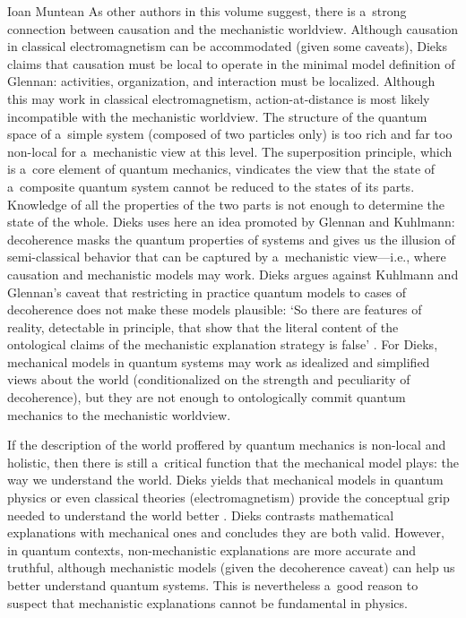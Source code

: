 \begin{recengenv}{Ioan Muntean}
As other authors in this volume suggest, there is a~strong connection between causation and the mechanistic worldview. Although causation in classical electromagnetism can be accommodated (given some caveats), Dieks claims that causation must be local to operate in the minimal model definition of Glennan: activities, organization, and interaction must be localized. Although this may work in classical electromagnetism, action-at-distance is most likely incompatible with the mechanistic worldview. The structure of the quantum space of a~simple system (composed of two particles only) is too rich and far too non-local for a~mechanistic view at this level. The superposition principle, which is a~core element of quantum mechanics, vindicates the view that the state of a~composite quantum system cannot be reduced to the states of its parts. Knowledge of all the properties of the two parts is not enough to determine the state of the whole. Dieks uses here an idea promoted by Glennan and Kuhlmann: decoherence masks the quantum properties of systems and gives us the illusion of semi-classical behavior that can be captured by a~mechanistic view---i.e., where causation and mechanistic models may work. Dieks argues against Kuhlmann and Glennan's caveat that restricting in practice quantum models to cases of decoherence does not make these models plausible: ‘So there are features of reality, detectable in principle, that show that the literal content of the ontological claims of the mechanistic explanation strategy is false'
\parencite*[][p.60]{falkenburg_mechanistic_2019}. %
 For Dieks, mechanical models in quantum systems may work as idealized and simplified views about the world (conditionalized on the strength and peculiarity of decoherence), but they are not enough to ontologically commit quantum mechanics to the mechanistic worldview.

If the description of the world proffered by quantum mechanics is non-local and holistic, then there is still a~critical function that the mechanical model plays: the way we understand the world. Dieks yields that mechanical models in quantum physics or even classical theories (electromagnetism) provide the conceptual grip needed to understand the world better
\parencite*[][p.63]{falkenburg_mechanistic_2019}. %
 Dieks contrasts mathematical explanations with mechanical ones and concludes they are both valid. However, in quantum contexts, non-mechanistic explanations are more accurate and truthful, although mechanistic models (given the decoherence caveat) can help us better understand quantum systems. This is nevertheless a~good reason to suspect that mechanistic explanations cannot be fundamental in physics.


\end{recengenv}
